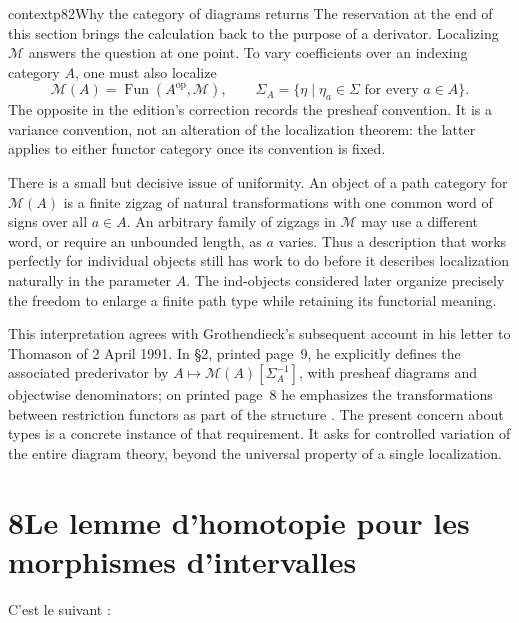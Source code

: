 

\begin{dcomment}{context}{p82}{Why the category of diagrams returns}
The reservation at the end of this section brings the calculation back to the purpose of a derivator. Localizing $\mathcal M$ answers the question at one point. To vary coefficients over an indexing category $A$, one must also localize
\[
 \mathcal M(A)=\operatorname{Fun}(A^{\mathrm{op}},\mathcal M),
 \qquad
 \Sigma_A=\{\eta\mid\eta_a\in\Sigma\text{ for every }a\in A\}.
\]
The opposite in the edition's correction records the presheaf convention. It is a variance convention, not an alteration of the localization theorem: the latter applies to either functor category once its convention is fixed.

There is a small but decisive issue of uniformity. An object of a path category for $\mathcal M(A)$ is a finite zigzag of natural transformations with one common word of signs over all $a\in A$. An arbitrary family of zigzags in $\mathcal M$ may use a different word, or require an unbounded length, as $a$ varies. Thus a description that works perfectly for individual objects still has work to do before it describes localization naturally in the parameter $A$. The ind-objects considered later organize precisely the freedom to enlarge a finite path type while retaining its functorial meaning.

This interpretation agrees with Grothendieck's subsequent account in his letter to Thomason of 2 April 1991. In \S2, printed page~9, he explicitly defines the associated prederivator by $A\mapsto\mathcal M(A)[\Sigma_A^{-1}]$, with presheaf diagrams and objectwise denominators; on printed page~8 he emphasizes the transformations between restriction functors as part of the structure \citep{Grothendieck1991Letter}. The present concern about types is a concrete instance of that requirement. It asks for controlled variation of the entire diagram theory, beyond the universal property of a single localization.
\end{dcomment}


\section*{8\quad Le lemme d'homotopie pour les morphismes d'intervalles}

C'est le suivant :

